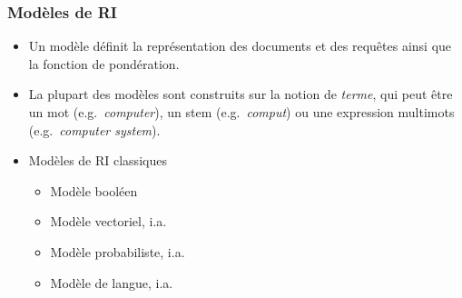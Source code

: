 \documentclass[12pt,aspectratio=43,dvipsnames,table]{beamer}
\begin{document}
\begin{frame}
    \frametitle{Modèles de RI}
    \begin{itemize} \itemsep10pt
        \item Un modèle définit la représentation des documents et des requêtes 
              ainsi que la fonction de pondération.
        \item La plupart des modèles sont construits sur la notion de 
              \textit{terme}, qui peut être un mot (e.g.~\textit{computer}), un 
              stem (e.g.~\textit{comput}) ou une expression multimots 
              (e.g.~\textit{computer system}).
        \item Modèles de RI classiques
        \begin{itemize}
            \item Modèle booléen
            \item Modèle vectoriel, i.a.~\cite{DBLP:journals/cacm/SaltonWY75}
            \item Modèle probabiliste, i.a.~\cite{robertson1976relevance}
            \item Modèle de langue, i.a.~\cite{DBLP:conf/sigir/PonteC98}
        \end{itemize}
    \end{itemize}
\end{frame}
\end{document}
